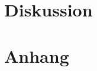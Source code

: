 \documentclass[12pt,a4paper,titlepage,headinclude,bibtotoc]{scrartcl}
\begin{document}
\section{Diskussion}
\label{sec:diskussion}

\section{Anhang}



\end{document}
